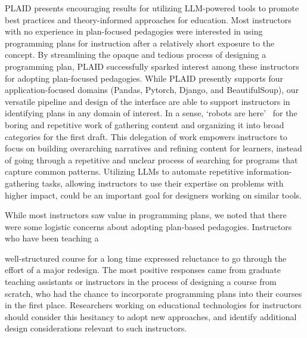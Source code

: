 PLAID presents encouraging results for utilizing LLM-powered tools to promote best practices and theory-informed approaches for education. Most instructors with no experience in plan-focused pedagogies were interested in using programming plans for instruction after a relatively short exposure to the concept. By streamlining the opaque and tedious process of designing a programming plan, PLAID successfully sparked interest among these instructors for adopting plan-focused pedagogies. While PLAID presently supports four application-focused domains (Pandas, Pytorch, Django, and BeautifulSoup), our versatile pipeline and design of the interface are able to support instructors in identifying plans in any domain of interest. In a sense, `robots are here'~\cite{pratherRobotsAreHere2023} for the boring and repetitive work of gathering content and organizing it into broad categories for the first draft. This delegation of work empowers instructors to focus on building overarching narratives and refining content for learners,
instead of going through a repetitive and unclear process of searching for programs that capture common patterns. Utilizing LLMs to automate repetitive information-gathering tasks, allowing instructors to use their expertise on problems with higher impact, could be an important goal for designers working on similar tools.


While most instructors saw value in programming plans, we noted that there were some logistic concerns about adopting plan-based pedagogies. Instructors who have been teaching a 

well-structured course for a long time expressed reluctance to go through the effort of a major redesign. The most positive responses came from graduate teaching assistants or instructors in the process of designing a course from scratch, who had the chance to incorporate programming plans into their courses in the first place. 
Researchers working on educational technologies for instructors should consider this hesitancy to adopt new approaches, and identify additional design considerations relevant to such instructors.








